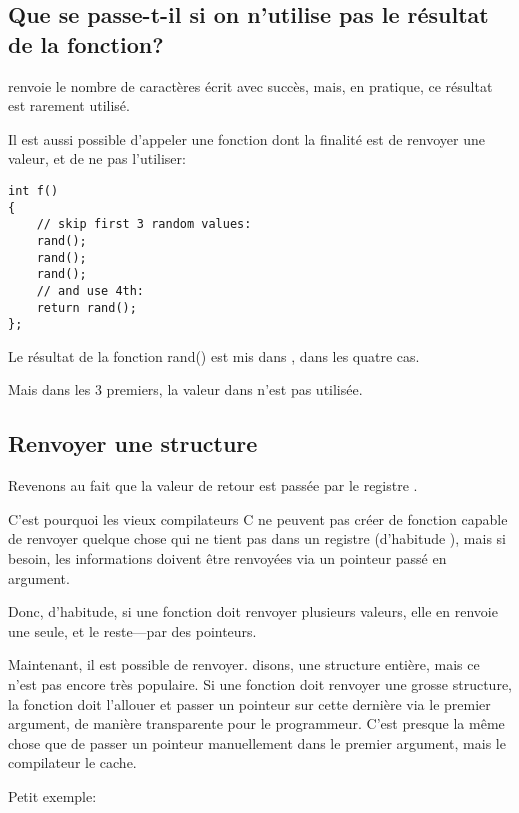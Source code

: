 \subsection{Que se passe-t-il si on n'utilise pas le résultat de la fonction?}

\printf renvoie le nombre de caractères écrit avec succès, mais, en pratique, ce
résultat est rarement utilisé.

Il est aussi possible d'appeler une fonction dont la finalité est de renvoyer une valeur,
et de ne pas l'utiliser:

\begin{lstlisting}[style=customc]
int f()
{
    // skip first 3 random values:
    rand();
    rand();
    rand();
    // and use 4th:
    return rand();
};
\end{lstlisting}

Le résultat de la fonction rand() est mis dans \EAX, dans les quatre cas.

Mais dans les 3 premiers, la valeur dans \EAX n'est pas utilisée.

\subsection{Renvoyer une structure}


Revenons au fait que la valeur de retour est passée par le registre \EAX.

C'est pourquoi les vieux compilateurs C ne peuvent pas créer de fonction capable
de renvoyer quelque chose qui ne tient pas dans un registre (d'habitude \Tint), mais
si besoin, les informations doivent être renvoyées via un pointeur passé en argument.

Donc, d'habitude, si une fonction doit renvoyer plusieurs valeurs, elle en renvoie
une seule, et le reste---par des pointeurs.

Maintenant, il est possible de renvoyer. disons, une structure entière, mais ce
n'est pas encore très populaire.
Si une fonction doit renvoyer une grosse structure, la fonction 
doit l'allouer et passer un pointeur sur cette dernière via le premier argument,
de manière transparente pour le programmeur.
C'est presque la même chose que de passer un pointeur manuellement dans le premier
argument, mais le compilateur le cache.

Petit exemple:



